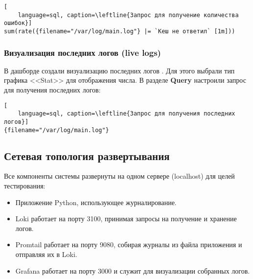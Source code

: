 \begin{lstlisting}[
	language=sql, caption=\leftline{Запрос для получение количества ошибок}]
sum(rate({filename="/var/log/main.log"} |= `Кеш не ответил` [1m]))
\end{lstlisting}


\begin{image}
    \caption{Создание визуализации количества ошибок}
    \label{fig:vis:errors}
\end{image}
\clearpage

\subsubsection{Визуализация последних логов (live logs)}

В дашборде создали визуализацию последних логов .
Для этого выбрали тип графика <<Stat>> для отображения числа.
В разделе \textbf{Query} настроили запрос для получения последних логов:

\begin{lstlisting}[
	language=sql, caption=\leftline{Запрос для получения последних логов}]
{filename="/var/log/main.log"}
\end{lstlisting}

\begin{image}
    \caption{Создание визуализации последних логов}
    \label{fig:vis:live}
\end{image}

\subsection{Сетевая топология развертывания}

Все компоненты системы развернуты на одном сервере (localhost)
для целей тестирования:

\begin{itemize}
    \item Приложение Python, использующее журналирование.
    \item Loki работает на порту 3100,
		принимая запросы на получение и хранение логов.
    \item Promtail работает на порту 9080,
		собирая журналы из файла приложения и отправляя их в Loki.
    \item Grafana работает на порту 3000
		и служит для визуализации собранных логов.
\end{itemize}

